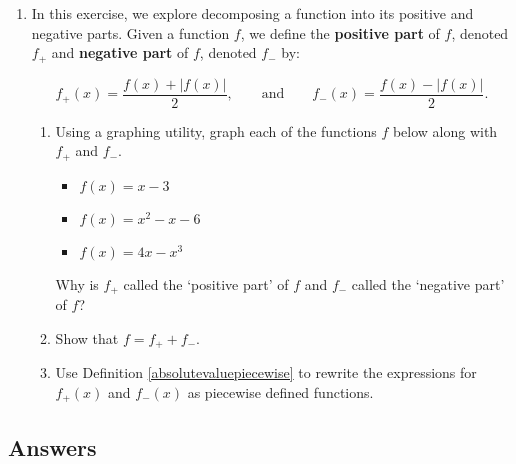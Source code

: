 \begin{enumerate}
\setcounter{enumi}{\value{HW}}

\item \label{posnegdecompexercise}  In this exercise, we explore decomposing a function into its positive and negative parts.  Given a function $f$, we define the \textbf{positive part} of $f$, denoted $f_{+}$ and \textbf{negative part} of $f$, denoted $f_{-}$ by:

\[ f_{+}(x) = \dfrac{f(x) + |f(x)|}{2}, \qquad \text{and} \qquad f_{-}(x) = \dfrac{f(x) - |f(x)|}{2}. \]

\begin{enumerate}

\item Using a graphing utility, graph each of the functions $f$ below along with $f_{+}$ and $f_{-}$.

\begin{multicols}{3}

\begin{itemize}

\item  $f(x) = x-3$

\item  $f(x) = x^2-x-6$

\item  $f(x) = 4x-x^3$

\end{itemize}

\end{multicols}

Why is $f_{+}$ called the `positive part' of $f$ and $f_{-}$ called the `negative part' of $f$?

\item Show that $f = f_{+} + f_{-}$.

\item Use Definition \ref{absolutevaluepiecewise} to rewrite the expressions for $f_{+}(x)$ and $f_{-}(x)$ as piecewise defined functions.

\end{enumerate}  

\setcounter{HW}{\value{enumi}}
\end{enumerate}

\newpage

\subsection{Answers}

